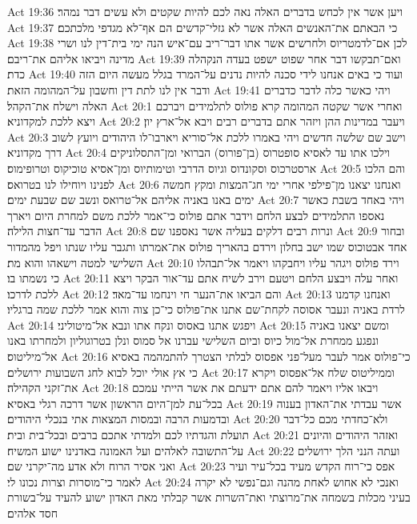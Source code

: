 Act 19:36  ויען אשר אין לכחש בדברים האלה נאה לכם להיות שקטים ולא עשים דבר נמהר׃
Act 19:37  כי הבאתם את־האנשים האלה אשר לא גזלי־קדשים הם אף־לא מגדפי מלכתכם׃
Act 19:38  לכן אם־לדמטריוס ולחרשים אשר אתו דבר־ריב עם־איש הנה ימי בית־דין לנו ושרי מדינה ויביאו אליהם את־ריבם׃
Act 19:39  ואם־תבקשו דבר אחר שפוט ישפט בעדה הנקהלה כדת׃
Act 19:40  ועוד כי באים אנחנו לידי סכנה להיות נדנים על־המרד בגלל מעשה היום הזה ודבר אין לנו לתת דין וחשבון על־המהומה הזאת׃
Act 19:41  ויהי כאשר כלה לדבר כדברים האלה וישלח את־הקהל׃
Act 20:1  ואחרי אשר שקטה המהומה קרא פולוס לתלמידים ויברכם ויצא ללכת למקדוניא׃
Act 20:2  ויעבר במדינות ההן ויזהר אתם בדברים רבים ויבא אל־ארץ יון׃
Act 20:3  וישב שם שלשה חדשים ויהי באמרו ללכת אל־סוריא ויארבו־לו היהודים ויועץ לשוב דרך מקדוניא׃
Act 20:4  וילכו אתו עד לאסיא סופטרוס (בן־פורוס) הברואי ומן־התסלוניקים ארסטרכוס וסקונדוס וגיוס הדרבי וטימותיוס ומן־אסיא טוכיקוס וטרופימוס׃
Act 20:5  והם הלכו לפנינו ויוחילו לנו בטרואס׃
Act 20:6  ואנחנו יצאנו מן־פילפי אחרי ימי חג־המצות ומקץ חמשה ימים באנו באניה אליהם אל־טרואס ונשב שם שבעת ימים׃
Act 20:7  ויהי באחד בשבת כאשר נאספו התלמידים לבצע הלחם וידבר אתם פולוס כי־אמר ללכת משם למחרת היום ויארך הדבר עד־חצות הלילה׃
Act 20:8  ונרות רבים דלקים בעליה אשר נאספנו שם׃
Act 20:9  ובחור אחד אבטוכוס שמו ישב בחלון וירדם בהאריך פולוס את־אמרתו ותגבר עליו שנתו ויפל מהמדור השלישי למטה וישאהו והוא מת׃
Act 20:10  וירד פולוס ויגהר עליו ויחבקהו ויאמר אל־תבהלו כי נשמתו בו׃
Act 20:11  ואחר עלה ויבצע הלחם ויטעם וירב לשיח אתם עד־אור הבקר ויצא ללכת לדרכו׃
Act 20:12  והם הביאו את־הנער חי וינחמו עד־מאד׃
Act 20:13  ואנחנו קדמנו לרדת באניה ונעבר אסוסה לקחת־שם אתנו את־פולוס כי־כן צוה והוא אמר ללכת שמה ברגליו׃
Act 20:14  ויפגש אתנו באסוס ונקח אתו ונבא אל־מיטוליני׃
Act 20:15  ומשם יצאנו באניה ונפגע ממחרת אל־מול כיוס וביום השלישי עברנו אל סמוס ונלן בטרוגוליון ולמחרתו באנו אל־מיליטוס׃
Act 20:16  כי־פולוס אמר לעבר מעל־פני אפסוס לבלתי הצטרך להתמהמה באסיא כי אץ אולי יוכל לבוא לחג השבועות ירושלים׃
Act 20:17  וממיליטוס שלח אל־אפסוס ויקרא את־זקני הקהילה׃
Act 20:18  ויבאו אליו ויאמר להם אתם ידעתם את אשר הייתי עמכם בכל־עת למן־היום הראשון אשר דרכה רגלי באסיא׃
Act 20:19  אשר עבדתי את־האדון בענוה ובדמעות הרבה ובמסות המצאות אתי בנכלי היהודים׃
Act 20:20  ולא־כחדתי מכם כל־דבר תועלת והגדתיו לכם ולמדתי אתכם ברבים ובכל־בית ובית׃
Act 20:21  ואזהר היהודים והיונים על־התשובה לאלהים ועל האמונה באדנינו ישוע המשיח׃
Act 20:22  ועתה הנני הלך ירושלים ואני אסיר הרוח ולא אדע מה־יקרני שם׃
Act 20:23  אפס כי־רוח הקדש מעיד בכל־עיר ועיר לאמר כי־מוסרות וצרות נכונו לי׃
Act 20:24  ואנכי לא אחוש לאחת מהנה וגם־נפשי לא יקרה בעיני מכלות בשמחה את־מרוצתי ואת־השרות אשר קבלתי מאת האדון ישוע להעיד על־בשורת חסד אלהים׃
